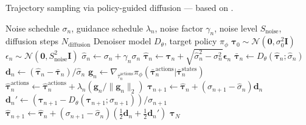 \documentclass[10pt]{article} %
\theoremstyle{plain}
\theoremstyle{definition}
\theoremstyle{remark}
\begin{document}
\begin{algorithm}[htb]
    \flushleft
    \caption{Trajectory sampling via {\color{pgd}policy-guided} diffusion --- based on \citet{karras2022elucidating}.}
    \label{alg:generation}
    \begin{algorithmic}[1]
         Noise schedule $\sigma_n$, guidance schedule $\lambda_n$, noise factor $\gamma_n$, noise level $S_{\text{noise}}$, diffusion steps $N_{\text{diffusion}}$
         Denoiser model $D_{\theta}$, target policy $\pi_{\phi}$
         $\bm{\tau}_0 \sim \mathcal{N}(\bm{0}, \sigma_0^2\bm{I})$ 
             $\epsilon_n \sim \mathcal{N}(\bm{0}, S^2_{\text{noise}}\bm{I})$ 
            \State $\hat{\sigma}_n \leftarrow \sigma_n + \gamma_n \sigma_n$
            \State $\bm{\hat{\tau}}_n \leftarrow \bm{\tau}_n + \sqrt{\hat{\sigma}_n^2 - \sigma_n^2}\bm{\epsilon}_n$
            \State $\bm{\bar{\tau}}_n \leftarrow D_{\theta}(\bm{\hat{\tau}}_n;\hat{\sigma}_n)$ 
            \State $\bm{d}_n \leftarrow \left(\bm{\hat{\tau}}_n - \bm{\bar{\tau}}_n\right)/\hat{\sigma}_n$  \color{pgd}
            \State $\bm{g}_n \leftarrow \nabla_{\bar{\tau}_n^{\text{actions}}} \pi_{\phi}(\bm{\bar{\tau}}_n^{\text{actions}} | \bm{\bar{\tau}}_n^{\text{states}})$ 
            \State $\bm{\hat{\tau}}_n^{\text{actions}} \leftarrow \bm{\hat{\tau}}_n^{\text{actions}} + \lambda_n (\bm{g}_n /\lVert\bm{g}_n\rVert_2)$  \hspace{-1mm}\color{black}
            \State $\bm{\tau}_{n+1} \leftarrow \bm{\hat{\tau}}_n + (\sigma_{n+1} - \hat{\sigma}_n)\bm{d}_n$ 
                \State $\bm{d}_n' \leftarrow \left(\bm{\tau}_{n+1} - D_{\theta}(\bm{\tau}_{n+1};\sigma_{n+1})\right)/\sigma_{n+1}$ 
                \State $\bm{\hat{\tau}}_{n+1} \leftarrow \bm{\hat{\tau}}_n + (\sigma_{n+1} - \hat{\sigma}_n)\left(\frac{1}{2}\bm{d}_n + \frac{1}{2}\bm{d}_n'\right)$
            \EndIf
        \EndFor
         $\bm{\tau}_N$
    \end{algorithmic}
\end{algorithm}
\end{document}

